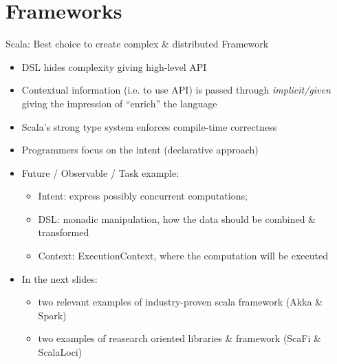\documentclass[presentation, 9pt]{beamer}\mode<presentation>{\usetheme{AMSBolognaFC}}
\begin{document}
\section{Frameworks}
\begin{frame}{Scala: Best choice to create complex \& distributed Framework}
	\begin{itemize}
		\item DSL hides complexity giving high-level API
  	\item Contextual information (i.e. to use API) is passed through \emph{implicit/given} giving the impression of ``enrich'' the language
   \item Scala's strong type system enforces compile-time correctness
   \item Programmers focus on the intent (declarative approach)
   \item Future / Observable / Task example:
   \begin{itemize}
			\item Intent: express possibly concurrent computations;
   		\item DSL: monadic manipulation, how the data should be combined \& transformed
     \item Context: ExecutionContext, where the computation will be executed 
	 \end{itemize}
	 \item In the next slides:
	 \begin{itemize}
			\item two relevant examples of industry-proven scala framework (Akka \& Spark)
   	\	\item two examples of reasearch oriented libraries \& framework (ScaFi \& ScalaLoci) 
	 \end{itemize}
	\end{itemize}
\end{frame}
\end{document}
